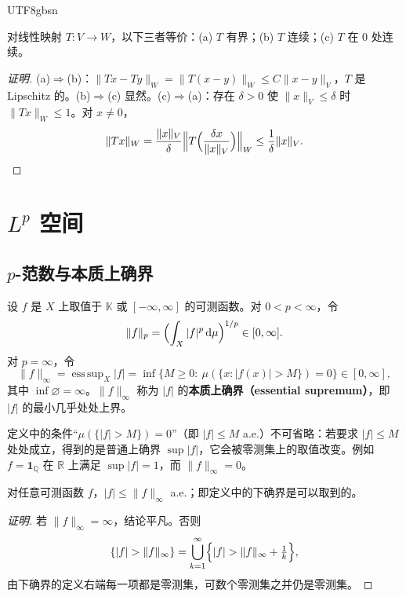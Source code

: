 \documentclass[11pt]{article}
\newcommand{\K}{\mathbb{K}}
\newcommand{\R}{\mathbb{R}}
\newcommand{\Q}{\mathbb{Q}}
\newcommand{\norm}[1]{\lVert #1\rVert}
\newcommand{\dmu}{\,\mathrm{d}\mu}
\newcommand{\ind}{\mathbf{1}}
\DeclareMathOperator*{\esssup}{ess\,sup}
\begin{document}
\begin{CJK*}{UTF8}{gbsn}
\begin{proposition}\label{prop:bounded-cont}
对线性映射 $T:V\to W$，以下三者等价：(a) $T$ 有界；(b) $T$ 连续；(c) $T$ 在 $0$ 处连续。
\end{proposition}

\begin{proof}[证明]
(a)$\Rightarrow$(b)：$\norm{Tx-Ty}_{W}=\norm{T(x-y)}_{W}\le C\norm{x-y}_{V}$，$T$ 是 Lipschitz 的。(b)$\Rightarrow$(c) 显然。(c)$\Rightarrow$(a)：存在 $\delta>0$ 使 $\norm{x}_{V}\le\delta$ 时 $\norm{Tx}_{W}\le1$。对 $x\ne0$，
\[
\norm{Tx}_{W}=\frac{\norm{x}_{V}}{\delta}\Bigl\|T\Bigl(\frac{\delta x}{\norm{x}_{V}}\Bigr)\Bigr\|_{W}\le\frac{1}{\delta}\norm{x}_{V}. \qedhere
\]
\end{proof}

\section{$L^{p}$ 空间}

\subsection{$p$-范数与本质上确界}

\begin{definition}\label{def:pnorm}
设 $f$ 是 $X$ 上取值于 $\K$ 或 $[-\infty,\infty]$ 的可测函数。对 $0<p<\infty$，令
\[
\norm{f}_{p}=\Bigl(\int_{X}|f|^{p}\dmu\Bigr)^{1/p}\in[0,\infty].
\]
对 $p=\infty$，令
\[
\norm{f}_{\infty}=\esssup_{X}|f|=\inf\bigl\{M\ge0:\ \mu(\{x:|f(x)|>M\})=0\bigr\}\in[0,\infty],
\]
其中 $\inf\varnothing=\infty$。$\norm{f}_{\infty}$ 称为 $|f|$ 的\textbf{本质上确界（essential supremum）}，即 $|f|$ 的最小几乎处处上界。
\end{definition}

\begin{remark}
定义中的条件“$\mu(\{|f|>M\})=0$”（即 $|f|\le M$ a.e.）不可省略：若要求 $|f|\le M$ 处处成立，得到的是普通上确界 $\sup|f|$，它会被零测集上的取值改变。例如 $f=\ind_{\Q}$ 在 $\R$ 上满足 $\sup|f|=1$，而 $\norm{f}_{\infty}=0$。
\end{remark}

\begin{lemma}\label{lem:esssup}
对任意可测函数 $f$，$|f|\le\norm{f}_{\infty}$ a.e.；即定义中的下确界是可以取到的。
\end{lemma}

\begin{proof}[证明]
若 $\norm{f}_{\infty}=\infty$，结论平凡。否则
\[
\{|f|>\norm{f}_{\infty}\}=\bigcup_{k=1}^{\infty}\Bigl\{|f|>\norm{f}_{\infty}+\tfrac1k\Bigr\},
\]
由下确界的定义右端每一项都是零测集，可数个零测集之并仍是零测集。
\end{proof}


\end{CJK*}
\end{document}
